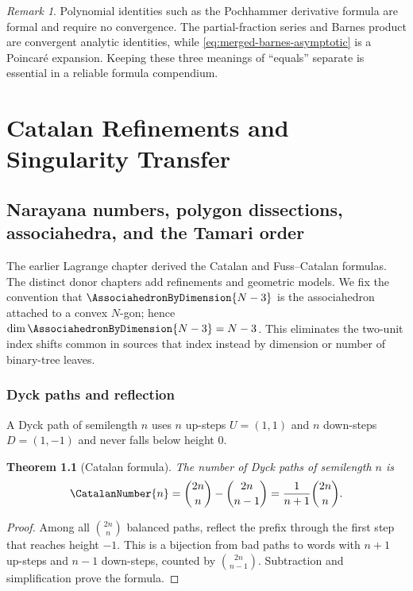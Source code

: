 \documentclass[11pt,a4paper,oneside,openany]{book}
\newtheorem{theorem}{Theorem}[chapter]
\theoremstyle{definition}
\theoremstyle{remark}
\newtheorem{remark}[theorem]{Remark}
\begin{document}
\begin{remark}
Polynomial identities such as the Pochhammer derivative formula are formal
and require no convergence.  The partial-fraction series and Barnes product
are convergent analytic identities, while
\eqref{eq:merged-barnes-asymptotic} is a Poincaré expansion.  Keeping these
three meanings of ``equals'' separate is essential in a reliable formula
compendium.
\end{remark}

\part{Catalan Refinements and Singularity Transfer}

\chapter{Narayana numbers, polygon dissections, associahedra, and the Tamari order}
\label{ch:merged-catalan-refinements}

The earlier Lagrange chapter derived the Catalan and Fuss--Catalan formulas.
The distinct donor chapters add refinements and geometric models.
We fix the convention that $\AssociahedronByDimension{N-3}$ is the associahedron attached to a
convex $N$-gon; hence $\dim\AssociahedronByDimension{N-3}=N-3$.  This eliminates the two-unit
index shifts common in sources that index instead by dimension or number of
binary-tree leaves.

\section{Dyck paths and reflection}

A Dyck path of semilength $n$ uses $n$ up-steps $U=(1,1)$ and $n$ down-steps
$D=(1,-1)$ and never falls below height $0$.

\begin{theorem}[Catalan formula]
\label{thm:merged-catalan-reflection}
The number of Dyck paths of semilength $n$ is
\begin{equation}
 \CatalanNumber{n}=\binom{2n}{n}-\binom{2n}{n-1}
 =\frac1{n+1}\binom{2n}{n}.                                       \label{eq:merged-catalan-reflection}
\end{equation}
\end{theorem}

\begin{proof}
Among all $\binom{2n}{n}$ balanced paths, reflect the prefix through the first
step that reaches height $-1$.  This is a bijection from bad paths to words
with $n+1$ up-steps and $n-1$ down-steps, counted by
$\binom{2n}{n-1}$.  Subtraction and simplification prove the formula.
\end{proof}
\end{document}
